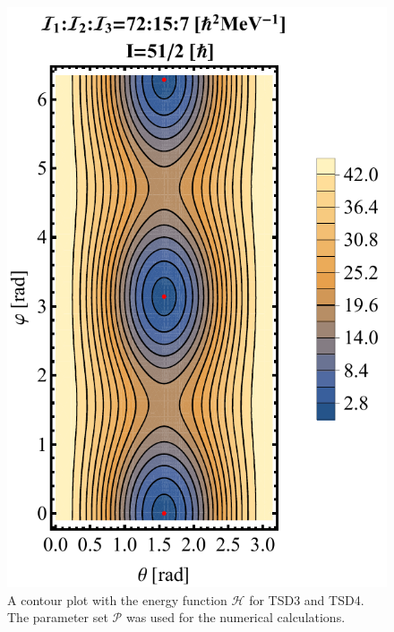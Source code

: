 \documentclass[%
 reprint,
 amsmath,
 amssymb,
 aps,
 floatfix,
]{revtex4-2}
\begin{document}
\begin{figure}
    \includegraphics[scale=0.55]{images/contour-tsd4.pdf}
    \caption{A contour plot with the energy function $\mathcal{H}$ for TSD3 and TSD4. The parameter set $\mathcal{P}$ was used for the numerical calculations.}
    \label{contour-tsd3}
\end{figure}

\end{document}
